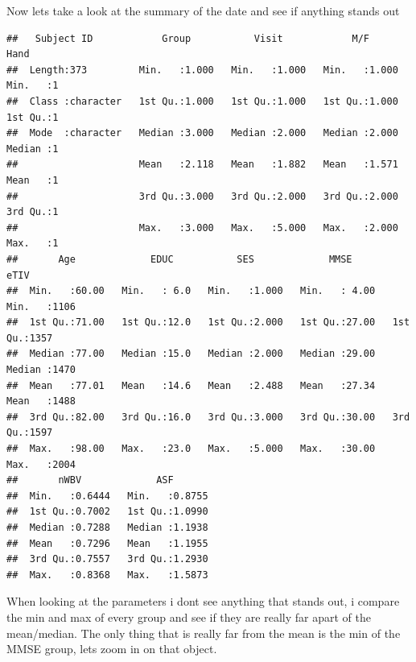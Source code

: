 \documentclass[
]{article}
\newenvironment{Shaded}{\begin{snugshade}}{\end{snugshade}}
\newcommand{\AttributeTok}[1]{\textcolor[rgb]{0.77,0.63,0.00}{#1}}
\newcommand{\ConstantTok}[1]{\textcolor[rgb]{0.00,0.00,0.00}{#1}}
\newcommand{\FunctionTok}[1]{\textcolor[rgb]{0.00,0.00,0.00}{#1}}
\newcommand{\NormalTok}[1]{#1}
\newcommand{\SpecialCharTok}[1]{\textcolor[rgb]{0.00,0.00,0.00}{#1}}
\begin{document}
Now lets take a look at the summary of the date and see if anything
stands out

\begin{verbatim}
##   Subject ID            Group           Visit            M/F             Hand  
##  Length:373         Min.   :1.000   Min.   :1.000   Min.   :1.000   Min.   :1  
##  Class :character   1st Qu.:1.000   1st Qu.:1.000   1st Qu.:1.000   1st Qu.:1  
##  Mode  :character   Median :3.000   Median :2.000   Median :2.000   Median :1  
##                     Mean   :2.118   Mean   :1.882   Mean   :1.571   Mean   :1  
##                     3rd Qu.:3.000   3rd Qu.:2.000   3rd Qu.:2.000   3rd Qu.:1  
##                     Max.   :3.000   Max.   :5.000   Max.   :2.000   Max.   :1  
##       Age             EDUC           SES             MMSE            eTIV     
##  Min.   :60.00   Min.   : 6.0   Min.   :1.000   Min.   : 4.00   Min.   :1106  
##  1st Qu.:71.00   1st Qu.:12.0   1st Qu.:2.000   1st Qu.:27.00   1st Qu.:1357  
##  Median :77.00   Median :15.0   Median :2.000   Median :29.00   Median :1470  
##  Mean   :77.01   Mean   :14.6   Mean   :2.488   Mean   :27.34   Mean   :1488  
##  3rd Qu.:82.00   3rd Qu.:16.0   3rd Qu.:3.000   3rd Qu.:30.00   3rd Qu.:1597  
##  Max.   :98.00   Max.   :23.0   Max.   :5.000   Max.   :30.00   Max.   :2004  
##       nWBV             ASF        
##  Min.   :0.6444   Min.   :0.8755  
##  1st Qu.:0.7002   1st Qu.:1.0990  
##  Median :0.7288   Median :1.1938  
##  Mean   :0.7296   Mean   :1.1955  
##  3rd Qu.:0.7557   3rd Qu.:1.2930  
##  Max.   :0.8368   Max.   :1.5873
\end{verbatim}

When looking at the parameters i dont see anything that stands out, i
compare the min and max of every group and see if they are really far
apart of the mean/median. The only thing that is really far from the
mean is the min of the MMSE group, lets zoom in on that object.

\begin{Shaded}
\end{Shaded}
\end{document}
